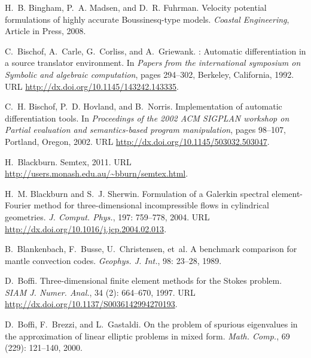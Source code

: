 \begin{thebibliography}{467}
H.~B. Bingham, P.~A. Madsen, and D.~R. Fuhrman.
\newblock Velocity potential formulations of highly accurate {B}oussinesq-type
  models.
\newblock \emph{Coastal Engineering}, Article in Press, 2008.

C.~Bischof, A.~Carle, G.~Corliss, and A.~Griewank.
: Automatic differentiation in a source translator
  environment.
\newblock In \emph{Papers from the international symposium on Symbolic and
  algebraic computation}, pages 294--302, Berkeley, California, 1992.
\newblock URL \url{http://dx.doi.org/10.1145/143242.143335}.

C.~H. Bischof, P.~D. Hovland, and B.~Norris.
\newblock Implementation of automatic differentiation tools.
\newblock In \emph{Proceedings of the 2002 {ACM} {SIGPLAN} workshop on Partial
  evaluation and semantics-based program manipulation}, pages 98--107,
  Portland, Oregon, 2002.
\newblock URL \url{http://dx.doi.org/10.1145/503032.503047}.

H.~Blackburn.
\newblock Semtex, 2011.
\newblock URL \url{http://users.monash.edu.au/~bburn/semtex.html}.

H.~M. Blackburn and S.~J. Sherwin.
\newblock Formulation of a {G}alerkin spectral element-{F}ourier method for
  three-dimensional incompressible flows in cylindrical geometries.
\newblock \emph{J. Comput. Phys.}, 197: 759--778, 2004.
\newblock URL \url{http://dx.doi.org/10.1016/j.jcp.2004.02.013}.

B.~Blankenbach, F.~Busse, U.~Christensen, et~al.
\newblock A benchmark comparison for mantle convection codes.
\newblock \emph{Geophys. J. Int.}, 98: 23--28, 1989.

D.~Boffi.
\newblock Three-dimensional finite element methods for the {S}tokes problem.
\newblock \emph{SIAM J. Numer. Anal.}, 34 (2): 664--670,
  1997.
\newblock URL \url{http://dx.doi.org/10.1137/S0036142994270193}.

D.~Boffi, F.~Brezzi, and L.~Gastaldi.
\newblock On the problem of spurious eigenvalues in the approximation of linear
  elliptic problems in mixed form.
\newblock \emph{Math. Comp.}, 69 (229): 121--140, 2000.


\end{thebibliography}
